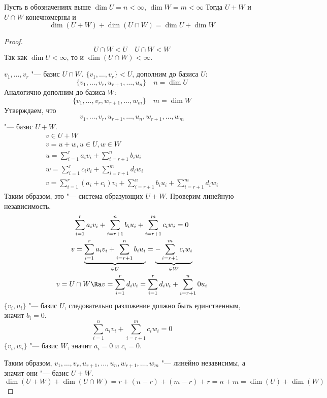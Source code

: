 \begin{theorem}
	Пусть в обозначениях выше $\dim U = n < \infty$, $\dim W = m < \infty$
	Тогда $U + W$ и $U \cap W$ конечномерны и
	\[ \dim(U + W) + \dim(U \cap W) = \dim U + \dim W \]
\end{theorem}
\begin{proof}
	\[ U \cap W < U \quad U \cap W < W \]
	Так как $\dim U < \infty$, то и $\dim (U \cap W) < \infty$.

	$v_1, \dots, v_r$ "--- базис  $U \cap W$.
	$\{v_1, \dots, v_r\} < U$, дополним до базиса $U$:
	\[ \{v_1, \dots, v_r, u_{r + 1}, \dots, u_{n}\} \quad n = \dim U \]
	Аналогично дополним до базиса $W$:
	\[ \{v_1, \dots, v_r, w_{r + 1}, \dots, w_{m}\} \quad m = \dim W \]
	Утверждаем, что
	\[ v_1, \dots, v_r, u_{r + 1}, \dots, u_n, w_{r + 1}, \dots, w_{m} \]
	"--- базис $U + W$.
	\begin{gather*}
		v \in U + W \\
		v = u + w, u \in U, w \in W \\
		u = \sum_{i = 1}^{r}a_iv_i + \sum_{i = r + 1}^{n}b_iu_i \\
		w = \sum_{i = 1}^{r}c_iv_i + \sum_{i = r + 1}^{m}d_iw_i \\
		v = \sum_{i = 1}^{r}(a_i + c_i)v_i + \sum_{i = r + 1}^{n}b_iu_i + \sum_{i = r + 1}^{m}d_iw_i
	\end{gather*}
	Таким образом, это "--- система образующих $U + W$.
	Проверим линейную независимость.
	\begin{gather*}
		\sum_{i = 1}^{r}a_iv_i + \sum_{i = r + 1}^{n}b_iu_i + \sum_{i = r + 1}^{m}c_iw_i = 0 \\
		v = \underbrace{\sum_{i = 1}^{r}a_iv_i + \sum_{i = r + 1}^{n}b_iu_i}_{\in U} = \underbrace{-\sum_{i = r + 1}^{m}c_iw_i}_{\in W} \\
		v = U \cap W \Ra v = \sum_{i = 1}^{r}d_iv_i = \sum_{i = 1}^{r}d_iv_i + \sum_{i = r + 1}^{n}0u_i
	\end{gather*}
	$\{v_i, u_i\}$ "--- базис $U$, следовательно разложение должно быть единственным, значит $b_i = 0$.
	\[ \sum_{i = 1}^{n}a_iv_i + \sum_{i = r + 1}^{m}c_iw_i = 0 \]
	$\{v_i, w_i\}$ "--- базис $W$, значит $a_i = 0$ и $c_i = 0$.

	Таким образом, $v_1, \dots, v_r, u_{r + 1}, \dots, u_n, w_{r + 1}, \dots, w_{m}$ "--- линейно независимы,
	а значит они "--- базис $U + W$.
	\[ \dim(U + W) + \dim(U \cap W) = r + (n - r) + (m  - r) + r = n + m = \dim(U) + \dim(W) \]
\end{proof}
